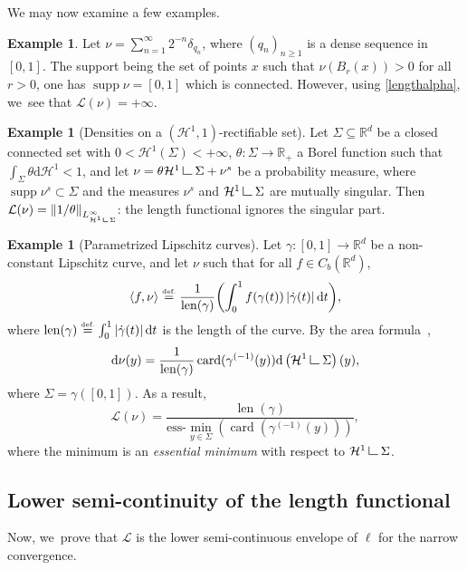 \documentclass[10pt]{amsart}
\theoremstyle{definition}
\newtheorem{example}[theorem]{Example}
\newcommand{\eqdef}{\ensuremath{\stackrel{\mbox{\upshape\tiny def.}}{=}}}
\newcommand{\norm}[1]{\left\lVert#1\right\rVert}
\newcommand\LM[1]{\hbox{\vrule width.5pt \vbox to#1pt{\vfill \hrule width#1pt height.5pt}}}
\newcommand\LL{{\mathchoice {\>\LM7\>}{\>\LM7\>}{\,\LM5\,}{\,\LM{3.35}\,}}}
\newcommand{\mres}{\LL}
\newcommand\cH{\mathcal{H}}
\newcommand{\RR}{\mathbb{R}}
\DeclareMathOperator{\supp}{supp}
\DeclareMathOperator{\len}{len}
\DeclareMathOperator{\card}{card}
\newcommand\dd{\mathrm{d}}
\newcommand{\abs}[1]{\left\lvert#1\right\rvert}
\newcommand{\ci}[2]{ \left[ #1, #2 \right] }
\begin{document}
We may now examine a few examples.
\begin{example}\label{example.diracs_dense_sequence}
Let $\nu=\sum_{n=1}^{\infty} 2^{-n}\delta_{q_n}$, where $(q_{n})_{n\ge 1}$ is a dense sequence in $\ci{0}{1}$. The support being the set of points $x$ such that $\nu(B_r(x)) > 0$ for all $r>0$, one has $\supp \nu = [0,1]$ which is connected. However, using \eqref{lengthalpha}, we~see that $\mathcal{L}(\nu)=+\infty$.
\end{example}

\begin{example}[Densities on a $(\cH^1,1)$-rectifiable set]\label{example.densities_rectifiable_set}
Let $\Sigma \subseteq \RR^d$ be a closed connected set with $0<\cH^1(\Sigma)<+\infty$, $\theta\colon \Sigma \rightarrow \RR_+$ a Borel function such that $ \int_\Sigma \theta\dd \cH^1 < 1$, and let $\nu = \theta \cH^1\mres \Sigma + \nu^s$ be a probability measure, where $\supp \nu^s \subset \Sigma$ and the measures $\nu^s$ and $\cH^1\mres\Sigma$ are mutually singular.
Then $\mathcal{L}(\nu)= \norm{1/\theta}_{L^\infty_{\cH^1\mres \Sigma}}$: the length functional ignores the singular part.
\end{example}

\begin{example}[Parametrized Lipschitz curves]\label{example.parametrized_curve}
Let $\gamma\colon \ci{0}{1}\rightarrow \RR^d$ be a non-constant Lipschitz curve, and let $\nu$ such that for all $f \in C_b(\RR^d)$,
\[
\langle f, \nu\rangle \eqdef \frac{1}{\len(\gamma)}\biggl(\int_0^1f(\gamma(t))\abs{\dot\gamma(t)}\dd t\biggr),
\]
where $\len(\gamma)\eqdef \int_0^1 \abs{\dot\gamma(t)}\dd t$ is the length of the curve.
By the area formula~\cite[Th.\,3.2.5]{federer2014geometric},
\begin{equation*}
\dd\nu(y)= \frac{1}{\len(\gamma)} \card(\gamma^{(-1)}(y))\dd\left( \cH^1\mres \Sigma\right)(y),
\end{equation*}
where $\Sigma=\gamma(\ci{0}{1})$. As a result,
\begin{equation}
\mathcal{L}(\nu) = \frac{\len(\gamma)}{\mathrm{ess}\mbox{-}\min_{y \in\Sigma}\left(\card(\gamma^{(-1)}(y))\right)},
\end{equation}
where the minimum is an \emph{essential minimum} with respect to $\cH^1\mres \Sigma$.
\end{example}

\subsection{Lower semi-continuity of the length functional}
\label{sec.length_functional_is_lsc}
Now, we~prove that $\mathcal{L}$ is the lower semi-continuous envelope of $\ell$ for the narrow convergence.
\end{document}
